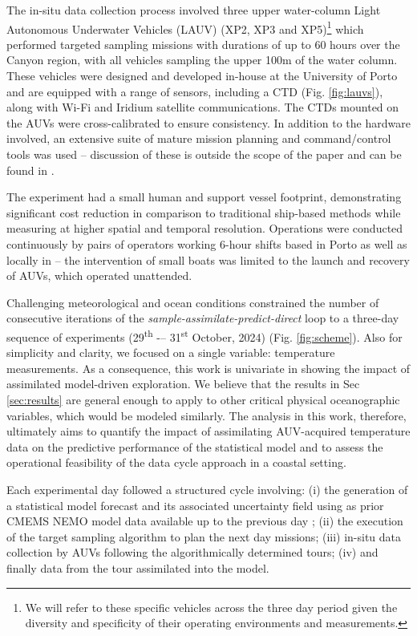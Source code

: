 The in-situ data collection process involved three upper water-column
Light Autonomous Underwater Vehicles (LAUV) (XP2, XP3 and
XP5)\footnote{We will refer to these specific vehicles across the
  three day period given the diversity and specificity of their
  operating environments and measurements.} which performed targeted
sampling missions with durations of up to 60 hours over the \naz
Canyon region, with all vehicles sampling the upper 100m of the water
column. These vehicles were designed and developed in-house at the
University of Porto \parencite{sousa2012lauv} and are equipped with a range
of sensors, including a CTD (Fig. \ref{fig:lauvs}), along with Wi-Fi
and Iridium satellite communications. The CTDs mounted on the AUVs
were cross-calibrated to ensure consistency. In addition to the
hardware involved, an extensive suite of mature mission planning and
command/control tools was used -- discussion of these is outside the
scope of the paper and can be found in
\textcite{dias2005neptus,seacons10,pinto2013lsts}.


The experiment had a small human and support vessel footprint,
demonstrating significant cost reduction in comparison to traditional
ship-based methods while measuring at higher spatial and temporal
resolution. Operations were conducted continuously by pairs of
operators working 6-hour shifts based in Porto as well as locally in
\naz -- the intervention of small boats was limited to the launch and
recovery of AUVs, which operated unattended.

Challenging meteorological and ocean conditions constrained the number
of consecutive iterations of the
\emph{sample-assimilate-predict-direct} loop to a three-day sequence
of experiments (29\textsuperscript{th} -– 31\textsuperscript{st}
October, 2024) (Fig. \ref{fig:scheme}). Also for simplicity and
clarity, we focused on a single variable: temperature measurements. As
a consequence, this work is univariate in showing the impact of
assimilated model-driven exploration. We believe that the results in
Sec \ref{sec:results} are general enough to apply to other critical
physical oceanographic variables, which would be modeled
similarly. The analysis in this work, therefore, ultimately aims to
quantify the impact of assimilating AUV-acquired temperature data on
the predictive performance of the statistical model and to assess the
operational feasibility of the data cycle approach in a coastal
setting.

Each experimental day followed a structured cycle involving: (i) the
generation of a statistical model forecast and its associated
uncertainty field using as prior CMEMS NEMO model data
available up to the previous day \parencite{sotillo2021}; (ii) the
execution of the target sampling algorithm to plan the next day
missions; (iii) in-situ data collection by AUVs following the
algorithmically determined tours; (iv) and finally data from the tour
assimilated into the model. %


